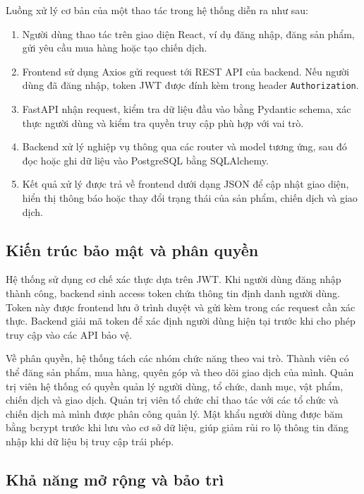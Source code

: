 \documentclass[12pt,a4paper]{report}
\begin{document}
Luồng xử lý cơ bản của một thao tác trong hệ thống diễn ra như sau:

\begin{enumerate}[leftmargin=1.2cm]
\item Người dùng thao tác trên giao diện React, ví dụ đăng nhập, đăng sản phẩm,
gửi yêu cầu mua hàng hoặc tạo chiến dịch.
\item Frontend sử dụng Axios gửi request tới REST API của backend. Nếu người
dùng đã đăng nhập, token JWT được đính kèm trong header \texttt{Authorization}.
\item FastAPI nhận request, kiểm tra dữ liệu đầu vào bằng Pydantic schema, xác
thực người dùng và kiểm tra quyền truy cập phù hợp với vai trò.
\item Backend xử lý nghiệp vụ thông qua các router và model tương ứng, sau đó
đọc hoặc ghi dữ liệu vào PostgreSQL bằng SQLAlchemy.
\item Kết quả xử lý được trả về frontend dưới dạng JSON để cập nhật giao diện,
hiển thị thông báo hoặc thay đổi trạng thái của sản phẩm, chiến dịch và giao dịch.
\end{enumerate}

\subsection{Kiến trúc bảo mật và phân quyền}

Hệ thống sử dụng cơ chế xác thực dựa trên JWT. Khi người dùng đăng nhập
thành công, backend sinh access token chứa thông tin định danh người dùng. Token
này được frontend lưu ở trình duyệt và gửi kèm trong các request cần xác thực.
Backend giải mã token để xác định người dùng hiện tại trước khi cho phép truy
cập vào các API bảo vệ.

Về phân quyền, hệ thống tách các nhóm chức năng theo vai trò. Thành viên có
thể đăng sản phẩm, mua hàng, quyên góp và theo dõi giao dịch của mình. Quản
trị viên hệ thống có quyền quản lý người dùng, tổ chức, danh mục, vật phẩm,
chiến dịch và giao dịch. Quản trị viên tổ chức chỉ thao tác với các tổ chức và
chiến dịch mà mình được phân công quản lý. Mật khẩu người dùng được băm bằng
bcrypt trước khi lưu vào cơ sở dữ liệu, giúp giảm rủi ro lộ thông tin đăng nhập
khi dữ liệu bị truy cập trái phép.

\subsection{Khả năng mở rộng và bảo trì}
\end{document}
